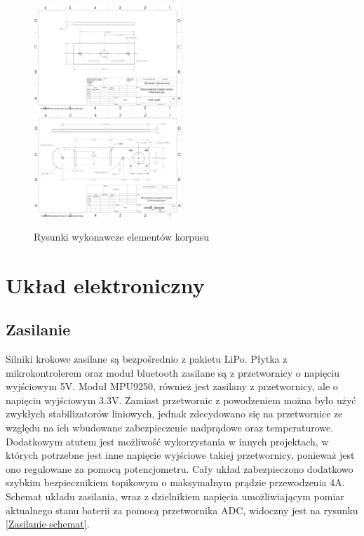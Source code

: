 \begin{figure}[h!]
    \centering
    \includegraphics[width=0.5\textwidth]{Rysunki/Rozdzial05/smallWall.png}
    \includegraphics[width=0.5\textwidth]{Rysunki/Rozdzial05/bigWall.png}
    \caption{Rysunki wykonawcze elementów korpusu}
    \label{rysunki wykonawcze}
\end{figure}

\section{Układ elektroniczny}

\subsection{Zasilanie}

Silniki krokowe zasilane są bezpośrednio z pakietu LiPo. Płytka z mikrokontrolerem oraz moduł bluetooth zasilane są z przetwornicy o napięciu wyjściowym 5V. Moduł MPU9250, również jest zasilany z przetwornicy, ale o napięciu wyjściowym 3.3V. Zamiast przetwornic z powodzeniem można było użyć zwykłych stabilizatorów liniowych, jednak zdecydowano się na przetwornice ze względu na ich wbudowane zabezpieczenie nadprądowe oraz temperaturowe. Dodatkowym atutem jest możliwość wykorzystania w innych projektach, w których potrzebne jest inne napięcie wyjściowe takiej przetwornicy, ponieważ jest ono regulowane za pomocą potencjometru. Cały układ zabezpieczono dodatkowo szybkim bezpiecznikiem topikowym o maksymalnym prądzie przewodzenia 4A. Schemat układu zasilania, wraz z dzielnikiem napięcia umożliwiającym pomiar aktualnego stanu baterii za pomocą przetwornika ADC, widoczny jest na rysunku \ref{Zasilanie schemat}.

